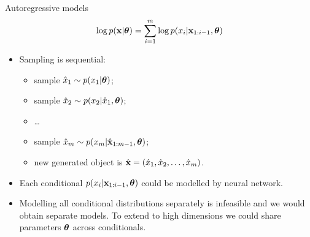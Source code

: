 \begin{frame}{Autoregressive models}
    \[
    \log p(\mathbf{x}| \boldsymbol{\theta}) = \sum_{i=1}^m \log p(x_i | \mathbf{x}_{1:i - 1}, \boldsymbol{\theta})
    \]
    \begin{itemize}
	    \item Sampling is sequential:
	    \begin{itemize}
    		\item sample $\hat{x}_1 \sim p(x_1 | \boldsymbol{\theta})$;
    		\item sample $\hat{x}_2 \sim p(x_2 | \hat{x}_1, \boldsymbol{\theta})$;
    		\item \dots
    		\item sample $\hat{x}_m \sim p(x_m | \hat{\mathbf{x}}_{1:m-1}, \boldsymbol{\theta})$;
    		\item new generated object is $\hat{\mathbf{x}} = (\hat{x}_1, \hat{x}_2, \dots, \hat{x}_m)$.
    	\end{itemize}
        \item Each conditional $p(x_i | \mathbf{x}_{1:i - 1}, \boldsymbol{\theta})$ could be modelled by neural network.
        \item Modelling all conditional distributions separately is infeasible and we would obtain separate models. To extend to high dimensions we could share parameters $\boldsymbol{\theta}$ across conditionals.

    \end{itemize}
\end{frame}
